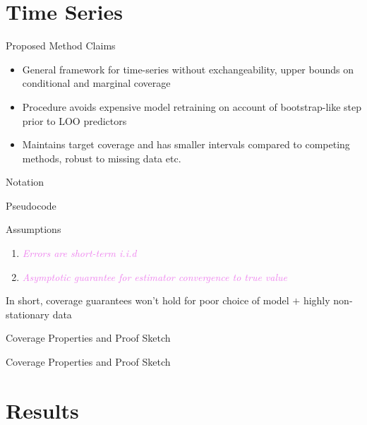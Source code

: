 \documentclass[usenames,dvipsnames]{beamer}
\theoremstyle{definition}
\begin{document}
\section{Time Series}
\begin{frame}{Proposed Method Claims}
    \begin{itemize}
        \item General framework for time-series without exchangeability, upper bounds on conditional and marginal coverage

        \item Procedure avoids expensive model retraining on account of bootstrap-like step prior to LOO predictors

        \item Maintains target coverage and has smaller intervals compared to competing methods, robust to missing data etc.
    \end{itemize}
\end{frame}

\begin{frame}{Notation}
    
\end{frame}


\begin{frame}{Pseudocode}
    
\end{frame}

\begin{frame}{Assumptions}
    \begin{enumerate}
        \item \textcolor{violet}{\emph{Errors are short-term i.i.d}}

        \item \textcolor{violet}{\emph{Asymptotic guarantee for estimator convergence to true value}}
    \end{enumerate}

    In short, coverage guarantees won't hold for poor choice of model $+$ highly non-stationary data 
\end{frame}

\begin{frame}{Coverage Properties and Proof Sketch}

\end{frame}

\begin{frame}{Coverage Properties and Proof Sketch}

\end{frame}
\section{Results}
\end{document}
